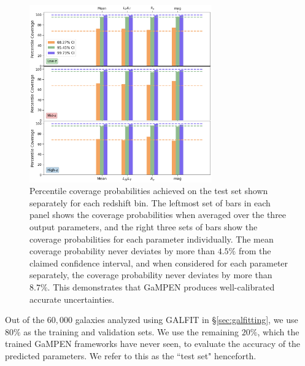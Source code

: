 \documentclass[linenumbers,twocolumn,twocolappendix]{aastex631}
\newcommand\gampen{GaMPEN}
\begin{document}
\begin{CJK*}{UTF8}{gbsn}
\begin{figure}[htb]
    \centering
    \includegraphics[width = 0.7\textwidth]{cov_prob_all_z.png}
    \caption{Percentile coverage probabilities achieved on the test set shown separately for each redshift bin. The leftmost set of bars in each panel shows the coverage probabilities when averaged over the three output parameters, and the right three sets of bars show the coverage probabilities for each parameter individually. The mean coverage probability never deviates by more than $4.5\%$ from the claimed confidence interval, and when considered for each parameter separately, the coverage probability never deviates by more than $8.7\%$. This demonstrates that \gampen{} produces well-calibrated accurate uncertainties.}
    \label{fig:cov_prob_all_z}
\end{figure}

Out of the $60,000$ galaxies analyzed using GALFIT in \S \ref{sec:galfitting}, we use $80\%$ as the training and validation sets. We use the remaining $20\%$, which the trained \gampen{} frameworks have never seen, to evaluate the accuracy of the predicted parameters. We refer to this as the ``test set" henceforth.


\end{CJK*}
\end{document}
